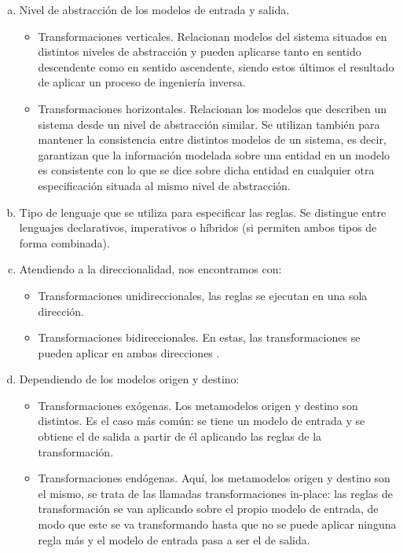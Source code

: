 \begin{enumerate}[a)]
    \item Nivel de abstracción de los modelos de entrada y salida.
    \begin{itemize}
		\item Transformaciones verticales. Relacionan modelos del sistema situados en distintos niveles de abstracción y pueden aplicarse tanto en sentido descendente como en sentido ascendente, siendo estos últimos el resultado de aplicar un proceso de ingeniería inversa.
		\item Transformaciones horizontales. Relacionan los modelos que describen un sistema desde un nivel de abstracción similar. Se utilizan también para mantener la consistencia entre distintos modelos de un sistema, es decir, garantizan que la información modelada sobre una entidad en un modelo es consistente con lo que se dice sobre dicha entidad en cualquier otra especificación situada al mismo nivel de abstracción.
    \end{itemize}
    \item Tipo de lenguaje que se utiliza para especificar las reglas. Se distingue entre lenguajes declarativos, imperativos o híbridos (si permiten ambos tipos de forma combinada).
    \item Atendiendo a la direccionalidad, nos encontramos con:
    \begin{itemize}
    	\item Transformaciones unidireccionales, las reglas se ejecutan en una sola dirección.
    	\item Transformaciones bidireccionales. En estas, las transformaciones se pueden aplicar en ambas direcciones .
    \end{itemize}
    \item Dependiendo de los modelos origen y destino:
    \begin{itemize}
    	\item Transformaciones exógenas. Los metamodelos origen y destino son distintos. Es el caso más común: se tiene un modelo de entrada y se obtiene el de salida a partir de él aplicando las reglas de la transformación. 
    	\item Transformaciones endógenas. Aquí, los metamodelos origen y destino son el mismo, se trata de las llamadas transformaciones in-place: las reglas de transformación se van aplicando sobre el propio modelo de entrada, de modo que este se va transformando hasta que no se puede aplicar ninguna regla más y el modelo de entrada pasa a ser el de salida.

\end{itemize}
\end{enumerate}
